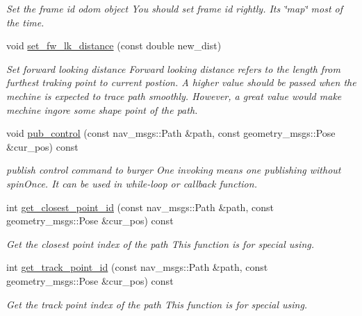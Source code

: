 \begin{DoxyCompactItemize}
\begin{DoxyCompactList}\small\item\em Set the frame id odom object You should set frame id rightly. It\textquotesingle{}s \char`\"{}map\char`\"{} most of the time. \end{DoxyCompactList}\item 
void \hyperlink{class_global___planning_1_1_track_unit_ae34bc618e5a33012f26d986883b6ead3}{set\+\_\+fw\+\_\+lk\+\_\+distance} (const double new\+\_\+dist)
\begin{DoxyCompactList}\small\item\em Set forward looking distance Forward looking distance refers to the length from furthest traking point to current postion. A higher value should be passed when the mechine is expected to trace path smoothly. However, a great value would make mechine ingore some shape point of the path. \end{DoxyCompactList}\item 
void \hyperlink{class_global___planning_1_1_track_unit_ae78e6a634662dce0f8c48a0caba8a38d}{pub\+\_\+control} (const nav\+\_\+msgs\+::\+Path \&path, const geometry\+\_\+msgs\+::\+Pose \&cur\+\_\+pos) const
\begin{DoxyCompactList}\small\item\em publish control command to burger One invoking means one publishing without spin\+Once. It can be used in while-\/loop or callback function. \end{DoxyCompactList}\item 
int \hyperlink{class_global___planning_1_1_track_unit_af206846d5a6ddbef34e23341a9dcf5d1}{get\+\_\+closest\+\_\+point\+\_\+id} (const nav\+\_\+msgs\+::\+Path \&path, const geometry\+\_\+msgs\+::\+Pose \&cur\+\_\+pos) const
\begin{DoxyCompactList}\small\item\em Get the closest point index of the path This function is for special using. \end{DoxyCompactList}\item 
int \hyperlink{class_global___planning_1_1_track_unit_ab55bd7b7b30500844bad389101ca9a0c}{get\+\_\+track\+\_\+point\+\_\+id} (const nav\+\_\+msgs\+::\+Path \&path, const geometry\+\_\+msgs\+::\+Pose \&cur\+\_\+pos) const
\begin{DoxyCompactList}\small\item\em Get the track point index of the path This function is for special using. \end{DoxyCompactList}\end{DoxyCompactItemize}


